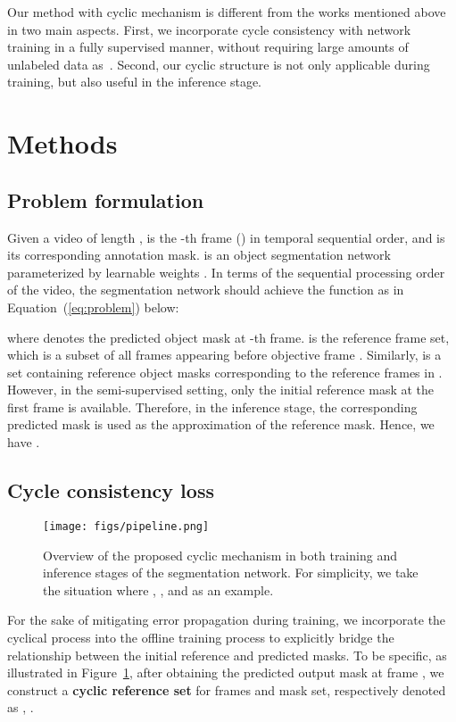 \documentclass{article}
\begin{document}
Our method with cyclic mechanism is different from the works mentioned above in two main aspects. First, we incorporate cycle consistency with network training in a fully supervised manner, without requiring large amounts of unlabeled data as~\cite{CVPR2019_CycleTime}. Second, our cyclic structure is not only applicable during training, but also useful in the inference stage. 

\section{Methods}



\subsection{Problem formulation}
Given a video of length ,  is the -th frame () in temporal sequential order, and  is its corresponding annotation mask.  is an object segmentation network parameterized by learnable weights . In terms of the sequential processing order of the video, the segmentation network should achieve the function as in Equation~(\ref{eq:problem}) below:

where  denotes the predicted object mask at -th frame.  is the reference frame set, which is a subset of all frames appearing before objective frame . Similarly,  is a set containing reference object masks corresponding to the reference frames in . However, in the semi-supervised setting, only the initial reference mask at the first frame is available. Therefore, in the inference stage, the corresponding predicted mask  is used as the approximation of the reference mask. Hence, we have .

\subsection{Cycle consistency loss}
\begin{figure}
    \centering
    \texttt{[image: figs/pipeline.png]}
    \caption{Overview of the proposed cyclic mechanism in both training and inference stages of the segmentation network. For simplicity, we take the situation where , ,  and  as an example.}
    \label{fig:framework}
\end{figure}

For the sake of mitigating error propagation during training, we incorporate the cyclical process into the offline training process to explicitly bridge the relationship between the initial reference and predicted masks. To be specific, as illustrated in Figure~\ref{fig:framework}, after obtaining the predicted output mask  at frame , we construct a \textbf{cyclic reference set} for frames and mask set, respectively denoted as , .
\end{document}
